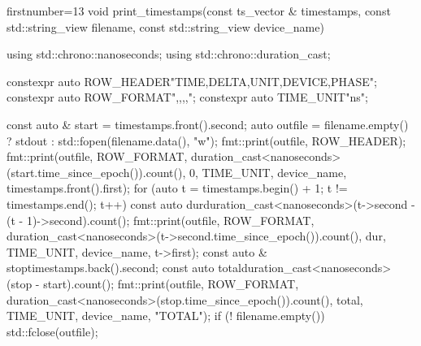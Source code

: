 \begin{cppcode*}{firstnumber=13}
void print_timestamps(const ts_vector & timestamps, const std::string_view filename, const std::string_view device_name) {
    using std::chrono::nanoseconds;
    using std::chrono::duration_cast;

    constexpr auto ROW_HEADER{"TIME,DELTA,UNIT,DEVICE,PHASE\n"};
    constexpr auto ROW_FORMAT{"{},{},{},{},{}\n"};
    constexpr auto TIME_UNIT{"ns"};

    const auto & start = timestamps.front().second;
    auto outfile = filename.empty() ? stdout : std::fopen(filename.data(), "w");
    fmt::print(outfile, ROW_HEADER);
    fmt::print(outfile, ROW_FORMAT, duration_cast<nanoseconds>(start.time_since_epoch()).count(), 0, TIME_UNIT, device_name, timestamps.front().first);
    for (auto t = timestamps.begin() + 1; t != timestamps.end(); t++) {
        const auto dur{duration_cast<nanoseconds>(t->second - (t - 1)->second).count()};
        fmt::print(outfile, ROW_FORMAT, duration_cast<nanoseconds>(t->second.time_since_epoch()).count(), dur, TIME_UNIT, device_name, t->first);
    }
    const auto & stop{timestamps.back().second};
    const auto total{duration_cast<nanoseconds>(stop - start).count()};
    fmt::print(outfile, ROW_FORMAT, duration_cast<nanoseconds>(stop.time_since_epoch()).count(), total, TIME_UNIT, device_name, "TOTAL");
    if (! filename.empty())
        std::fclose(outfile);
}
\end{cppcode*}

